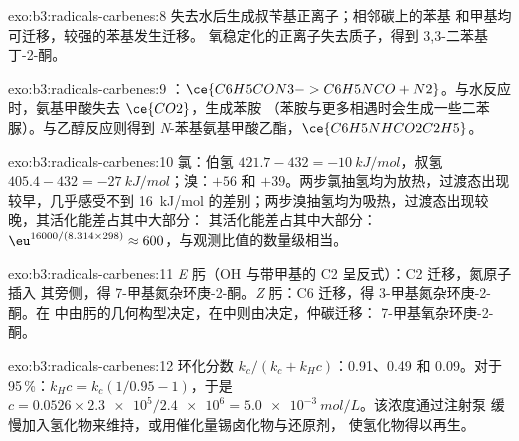 \begin{solution}{exo:b3:radicals-carbenes:8}
失去水后生成叔苄基正离子；相邻碳上的苯基
和甲基均可迁移，较强的苯基发生迁移。
氧稳定化的正离子失去质子，得到 3,3-二苯基丁-2-酮。
\end{solution}

\begin{solution}{exo:b3:radicals-carbenes:9}
：$\ce{C6H5CON3 -> C6H5NCO + N2}$。与水反应时，氨基甲酸失去 $\ce{CO2}$，生成苯胺
（苯胺与更多相遇时会生成一些二苯脲）。与乙醇反应则得到
\textit{N}-苯基氨基甲酸乙酯，$\ce{C6H5NHCO2C2H5}$。
\end{solution}

\begin{solution}{exo:b3:radicals-carbenes:10}
氯：伯氢 $421.7 - 432 = \qty{-10}{kJ/mol}$，叔氢 $405.4 - 432 = \qty{-27}{kJ/mol}$；溴：$+56$ 和
$+39$。两步氯抽氢均为放热，过渡态出现较早，几乎感受不到
\qty{16}{kJ/mol} 的差别；两步溴抽氢均为吸热，过渡态出现较晚，其活化能差占其中大部分：
其活化能差占其中大部分：
$\eu^{16000/(8.314 \times 298)} \approx 600$，与观测比值的数量级相当。
\end{solution}

\begin{solution}{exo:b3:radicals-carbenes:11}
\textit{E} 肟（OH 与带甲基的 C2 呈反式）：C2 迁移，氮原子插入
其旁侧，得 7-甲基氮杂环庚-2-酮。\textit{Z} 肟：C6 迁移，得 3-甲基氮杂环庚-2-酮。在
中由肟的几何构型决定，在中则由决定，仲碳迁移：
7-甲基氧杂环庚-2-酮。
\end{solution}

\begin{solution}{exo:b3:radicals-carbenes:12}
环化分数 $k_c/(k_c + k_H c)$：0.91、0.49 和 0.09。对于 95\,\%：$k_Hc = k_c(1/0.95 - 1)$，于是
$c = 0.0526 \times \num{2.3e5}/\num{2.4e6} = \qty{5.0e-3}{mol/L}$。该浓度通过注射泵
缓慢加入氢化物来维持，或用催化量锡卤化物与还原剂，
使氢化物得以再生。
\end{solution}

